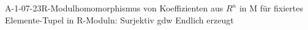 
\begin{EXA}{A-1-07-23}{R-Modulhomomorphismus von Koeffizienten aus $R^n$ in M für fixiertes Elemente-Tupel in R-Moduln: Surjektiv gdw Endlich erzeugt}
\end{EXA}
